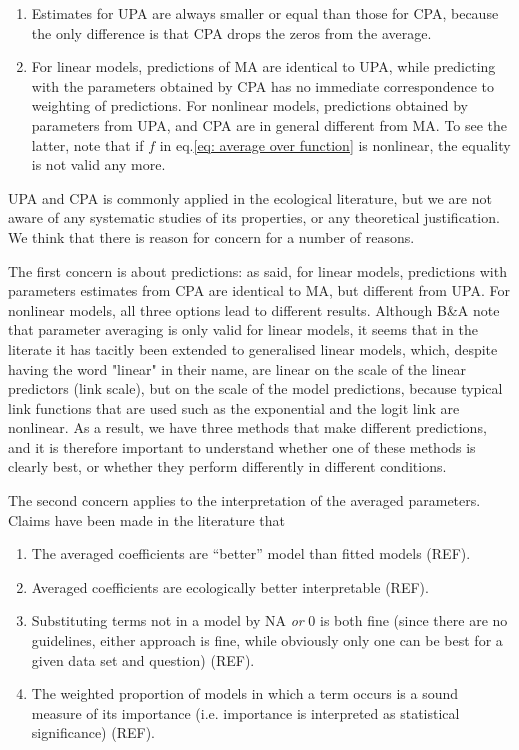 \documentclass[5p]{elsarticle}
\begin{document}
\begin{enumerate}
\item Estimates for UPA are always smaller or equal than those for CPA, because the only difference is that CPA drops the zeros from the average. 
\item For linear models, predictions of MA are identical to UPA, while predicting with the parameters obtained by CPA has no immediate correspondence to weighting of predictions. For nonlinear models, predictions obtained by parameters from UPA, and CPA are in general different from MA. To see the latter, note that if $f$ in eq.\ref{eq: average over function} is nonlinear, the equality is not valid any more.
\end{enumerate}

UPA and CPA is commonly applied in the ecological literature, but we are not aware of any systematic studies of its properties, or any theoretical justification. We think that there is reason for concern for a number of reasons. 

The first concern is about predictions: as said, for linear models, predictions with parameters estimates from CPA are identical to MA, but different from UPA. For nonlinear models, all three options lead to different results. Although B\&A note that parameter averaging is only valid for linear models, it seems that in the literate it has tacitly been extended to generalised linear models, which, despite having the word "linear" in their name, are linear on the scale of the linear predictors (link scale), but on the scale of the model predictions, because typical link functions that are used such as the exponential and the logit link are nonlinear. As a result, we have three methods that make different predictions, and it is therefore important to understand whether one of these methods is clearly best, or whether they perform differently in different conditions. 

The second concern applies to the interpretation of the averaged parameters. Claims have been made in the literature that 
 
\begin{enumerate}
\item The averaged coefficients are ``better'' model than fitted models (REF).
\item Averaged coefficients are ecologically better interpretable (REF).
\item Substituting terms not in a model by NA \emph{or} 0 is both fine (since there are no guidelines, either approach is fine, while obviously only one can be best for a given data set and question) (REF).
\item The weighted proportion of models in which a term occurs is a sound measure of its importance (i.e. importance is interpreted as statistical significance) (REF).
\end{enumerate}
\end{document}
